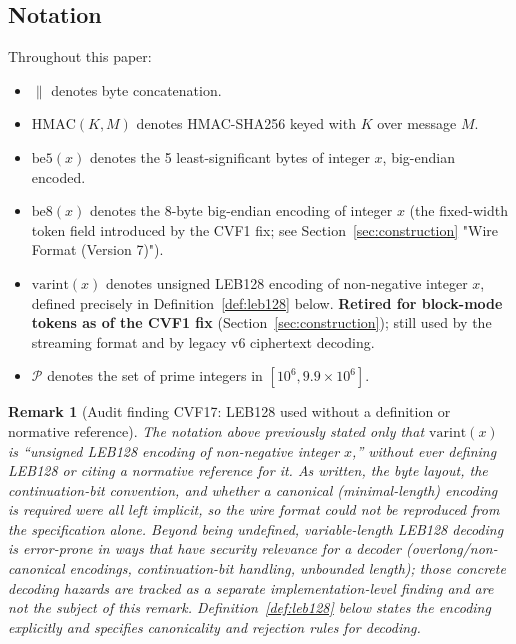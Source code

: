 \documentclass[11pt,a4paper]{article}
\newtheorem{remark}[theorem]{Remark}
\begin{document}
\subsection{Notation}

Throughout this paper:
\begin{itemize}
  \item $\|$ denotes byte concatenation.
  \item $\mathrm{HMAC}(K, M)$ denotes HMAC-SHA256 keyed with $K$ over message $M$.
  \item $\mathrm{be5}(x)$ denotes the 5 least-significant bytes of integer $x$,
        big-endian encoded.
  \item $\mathrm{be8}(x)$ denotes the 8-byte big-endian encoding of integer $x$
        (the fixed-width token field introduced by the CVF1 fix; see
        Section~\ref{sec:construction} "Wire Format (Version 7)").
  \item $\mathrm{varint}(x)$ denotes unsigned LEB128 encoding of non-negative
        integer $x$, defined precisely in Definition~\ref{def:leb128} below.
        \textbf{Retired for block-mode tokens as of the CVF1 fix}
        (Section~\ref{sec:construction}); still used by the streaming format
        and by legacy v6 ciphertext decoding.
  \item $\mathcal{P}$ denotes the set of prime integers in $[10^6, 9.9 \times 10^6]$.
\end{itemize}

\begin{remark}[Audit finding CVF17: LEB128 used without a definition or normative reference]
\label{rem:cvf17}
The notation above previously stated only that $\mathrm{varint}(x)$ is
``unsigned LEB128 encoding of non-negative integer $x$,'' without ever
defining LEB128 or citing a normative reference for it. As written, the
byte layout, the continuation-bit convention, and whether a canonical
(minimal-length) encoding is required were all left implicit, so the wire
format could not be reproduced from the specification alone. Beyond being
undefined, variable-length LEB128 decoding is error-prone in ways that
have security relevance for a decoder (overlong/non-canonical encodings,
continuation-bit handling, unbounded length); those concrete decoding
hazards are tracked as a separate implementation-level finding and are not
the subject of this remark. Definition~\ref{def:leb128} below states the
encoding explicitly and specifies canonicality and rejection rules for
decoding.
\end{remark}
\end{document}
